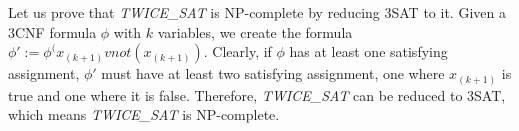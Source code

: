 
Let us prove that \textit{TWICE\_SAT} is NP-complete by reducing 3SAT to it.
Given a 3CNF formula $\phi$ with $k$ variables, we create the formula $\phi' := \phi ^ (x_(k+1) v not(x_(k+1))$.
Clearly, if $\phi$ has at least one satisfying assignment, $\phi'$ must have at least two satisfying assignment, one where $x_(k+1)$ is true and one where it is false.
Therefore, \textit{TWICE\_SAT} can be reduced to 3SAT, which means \textit{TWICE\_SAT} is NP-complete.